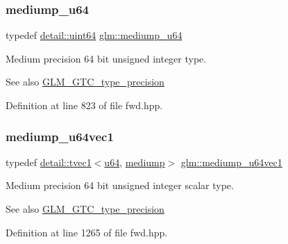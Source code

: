 \subsubsection{\texorpdfstring{mediump\+\_\+u64}{mediump\_u64}}
{\footnotesize\ttfamily typedef \hyperlink{namespaceglm_1_1detail_adec4b19bf4982125e122db2fe03c5810}{detail\+::uint64} \hyperlink{group__gtc__type__precision_ga00c51a16fa190b0a90205d50d6d8a44a}{glm\+::mediump\+\_\+u64}}

Medium precision 64 bit unsigned integer type. \begin{DoxySeeAlso}{See also}
\hyperlink{group__gtc__type__precision}{G\+L\+M\+\_\+\+G\+T\+C\+\_\+type\+\_\+precision} 
\end{DoxySeeAlso}


Definition at line 823 of file fwd.\+hpp.

\mbox{\label{group__gtc__type__precision_gaf4211dc9e211d57b34b45a612b6de193}} 
\subsubsection{\texorpdfstring{mediump\+\_\+u64vec1}{mediump\_u64vec1}}
{\footnotesize\ttfamily typedef \hyperlink{structglm_1_1detail_1_1tvec1}{detail\+::tvec1}$<$\hyperlink{group__gtc__type__precision_ga71cedd4972f9cb1a5e14dfe5ab83ecd7}{u64}, \hyperlink{namespaceglm_a0f04f086094c747d227af4425893f545a6416f3ea0c9025fb21ed50c4d6620482}{mediump}$>$ \hyperlink{group__gtc__type__precision_gaf4211dc9e211d57b34b45a612b6de193}{glm\+::mediump\+\_\+u64vec1}}

Medium precision 64 bit unsigned integer scalar type. \begin{DoxySeeAlso}{See also}
\hyperlink{group__gtc__type__precision}{G\+L\+M\+\_\+\+G\+T\+C\+\_\+type\+\_\+precision} 
\end{DoxySeeAlso}


Definition at line 1265 of file fwd.\+hpp.

\mbox{\label{group__gtc__type__precision_ga9eda8d6f5be7a2919fb90412535b385f}} 
